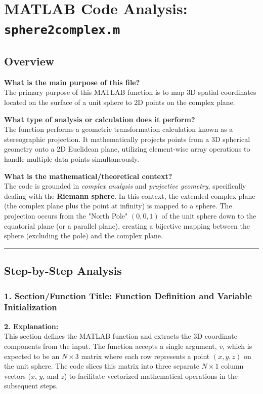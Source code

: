 
\chapter{MATLAB Code Analysis: \texttt{sphere2complex.m}}
\date{}


\maketitle

\section{Overview}

\textbf{What is the main purpose of this file?}\\
The primary purpose of this MATLAB function is to map 3D spatial coordinates located on the surface of a unit sphere to 2D points on the complex plane.

\textbf{What type of analysis or calculation does it perform?}\\
The function performs a geometric transformation calculation known as a stereographic projection. It mathematically projects points from a 3D spherical geometry onto a 2D Euclidean plane, utilizing element-wise array operations to handle multiple data points simultaneously.

\textbf{What is the mathematical/theoretical context?}\\
The code is grounded in \textit{complex analysis} and \textit{projective geometry}, specifically dealing with the \textbf{Riemann sphere}. In this context, the extended complex plane (the complex plane plus the point at infinity) is mapped to a sphere. The projection occurs from the "North Pole" $(0, 0, 1)$ of the unit sphere down to the equatorial plane (or a parallel plane), creating a bijective mapping between the sphere (excluding the pole) and the complex plane. 

\vspace{1em}
\hrule
\vspace{1em}

\section{Step-by-Step Analysis}

\subsection*{1. Section/Function Title: Function Definition and Variable Initialization}
\textbf{2. Explanation:} \\
This section defines the MATLAB function and extracts the 3D coordinate components from the input. The function accepts a single argument, $v$, which is expected to be an $N \times 3$ matrix where each row represents a point $(x, y, z)$ on the unit sphere. The code slices this matrix into three separate $N \times 1$ column vectors ($x$, $y$, and $z$) to facilitate vectorized mathematical operations in the subsequent steps.

